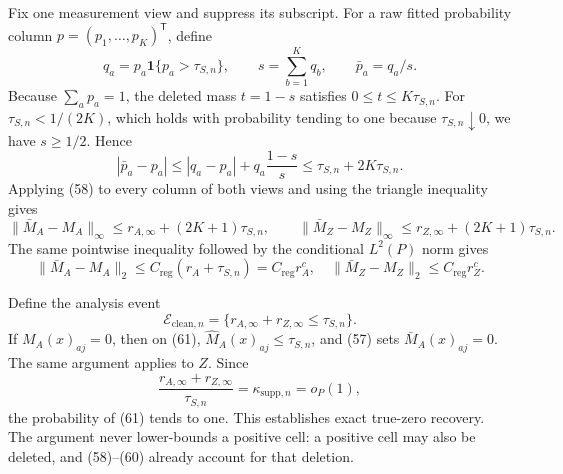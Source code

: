 Fix one measurement view and suppress its subscript.  For a raw fitted probability column \(p=(p_1,\ldots,p_K)^{\mathsf T}\), define
\[
 q_a=p_a\mathbf 1\{p_a>\tau_{S,n}\},
 \qquad s=\sum_{b=1}^Kq_b,
 \qquad \bar p_a=q_a/s.                                         \tag{57}
\]
Because \(\sum_ap_a=1\), the deleted mass \(t=1-s\) satisfies \(0\leq t\leq K\tau_{S,n}\).  For \(\tau_{S,n}<1/(2K)\), which holds with probability tending to one because \(\tau_{S,n}\downarrow0\), we have \(s\geq1/2\).  Hence
\[
 |\bar p_a-p_a|
 \leq|q_a-p_a|+q_a\frac{1-s}{s}
 \leq\tau_{S,n}+2K\tau_{S,n}.                                 \tag{58}
\]
Applying (58) to every column of both views and using the triangle inequality gives
\[
 \|\bar M_A-M_A\|_\infty
 \leq r_{A,\infty}+(2K+1)\tau_{S,n},
 \qquad
 \|\bar M_Z-M_Z\|_\infty
 \leq r_{Z,\infty}+(2K+1)\tau_{S,n}.                           \tag{59}
\]
The same pointwise inequality followed by the conditional \(L^2(P)\) norm gives
\[
 \|\bar M_A-M_A\|_2\leq C_{\mathrm{reg}}(r_A+\tau_{S,n})
 =C_{\mathrm{reg}}r_A^c,
 \quad
 \|\bar M_Z-M_Z\|_2\leq C_{\mathrm{reg}}r_Z^c.               \tag{60}
\]

Define the analysis event
\[
 \mathcal E_{\mathrm{clean},n}
 =\{r_{A,\infty}+r_{Z,\infty}\leq\tau_{S,n}\}.               \tag{61}
\]
If \(M_A(x)_{aj}=0\), then on (61), \(\widehat M_A(x)_{aj}\leq\tau_{S,n}\), and (57) sets \(\bar M_A(x)_{aj}=0\).  The same argument applies to \(Z\).  Since
\[
 \frac{r_{A,\infty}+r_{Z,\infty}}{\tau_{S,n}}
 =\kappa_{\mathrm{supp},n}=o_P(1),                              \tag{62}
\]
the probability of (61) tends to one.  This establishes exact true-zero recovery.  The argument never lower-bounds a positive cell: a positive cell may also be deleted, and (58)--(60) already account for that deletion.

